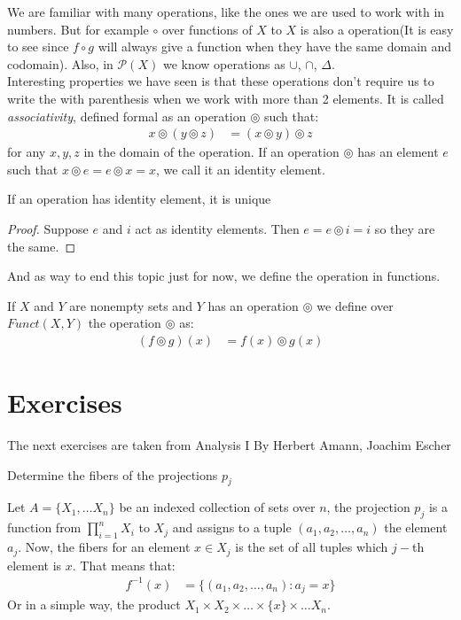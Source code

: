 \documentclass{tufte-handout}
\begin{document}
We are familiar with many operations, like the ones we are used to work with in numbers. But for example $\circ$ over functions of $X$ to $X$ is also a operation(It is easy to see since $f \circ g$ will always give a function when they have the same domain and codomain). Also, in $\mathcal{P}(X)$ we know operations as $\cup$, $\cap$, $\Delta$. \\

Interesting properties we have seen is that these operations don't require us to write the with parenthesis when we work with more than 2 elements. It is called \textit{associativity}, defined formal as an operation $\circledcirc$ such that:
\begin{align*}
	x \circledcirc (y \circledcirc z) &= (x \circledcirc y) \circledcirc z
\end{align*}
for any $x, y, z$ in the domain of the operation. If an operation $\circledcirc$ has an element $e$ such that $x \circledcirc e = e \circledcirc x = x$, we call it an identity element. 

\begin{theorem}
	If an operation has identity element, it is unique
\end{theorem}
\begin{proof}
	Suppose $e$ and $i$ act as identity elements. Then $e = e \circledcirc i = i$ so they are the same.
\end{proof}

And as way to end this topic just for now, we define the operation in functions.
\begin{definition}
	If $X$ and $Y$ are nonempty sets and $Y$ has an operation $\circledcirc$ we define over $Funct(X, Y)$ the operation $\circledcirc$ as:
	\begin{align*}
		(f \circledcirc g)(x) &= f(x) \circledcirc g(x)
	\end{align*}
\end{definition}

\section{Exercises}
The next exercises are taken from Analysis I By Herbert Amann, Joachim Escher
\begin{problem}
	Determine the fibers of the projections $p_j$
\end{problem}
Let $A = \{X_1, \dots X_n\}$ be an indexed collection of sets over $n$, the projection $p_j$ is a function
from $\prod\limits_{i = 1}^n X_i$ to $X_j$ and assigns to a tuple $(a_1, a_2, \dots, a_n)$ the element $a_j$. Now, the fibers for an element $x \in X_j$ is the set of all tuples which $j-$th element is $x$. That means that:
\begin{align*}
	f^{-1}(x) &= \{(a_1, a_2, \dots, a_n): a_j = x\}
\end{align*}
Or in a simple way, the product $X_1 \times X_2 \times \dots \times\{x\} \times \dots X_n$. 
\end{document}
